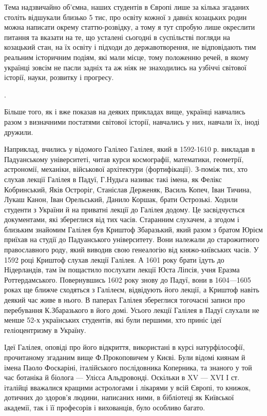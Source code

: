 Тема надзвичайно об'ємна, наших студентів в Європі лише за кілька згаданих
століть відшукали близько 5 тис, про освіту кожної з давніх козацьких родин
можна написати окрему статтю-розвідку, а тому я тут спробую лише окреслити
питання та вказати на те, що усталені сьогодні в суспільстві погляди на
козацький стан, на їх освіту і підходи до державотворення, не відповідають тим
реальним історичним подіям, які мали місце, тому положенню речей, в якому
українці зовсім не пасли задніх та аж ніяк не знаходились на узбіччі світової
історії, науки, розвитку і прогресу.

.

Більше того, як і вже показав на деяких прикладах вище, українці навчались
разом з визначними постатями світової історії, навчались у них, навчали їх,
іноді дружили.

Наприклад, вчились у відомого Галілео Галілея, який в 1592-1610 р. викладав в
Падуанському університеті, читав курси космографії, математики, геометрії,
астрономії, механіки, військової архітектури (фортифікації). З-поміж тих, хто
слухав лекції Галілея в Падуї, Г.Нудьга називає такі імена, як Фелікс
Кобринський, Яків Остроріг, Станіслав Держеняк, Василь Копеч, Іван Тичина,
Лукаш Канон, Іван Орельський, Данило Коршак, брати Острозькі. Ходили студенти з
України й на приватні лекції до Галілея додому. Це засвідчується документами,
які збереглися від тих часів. Старанним слухачем, а згодом і близьким знайомим
Галілея був Криштоф Збаразький, який разом з братом Юрієм приїхав на студії до
Падуанського університету. Вони належали до старожитного православного роду,
який виводив свою генеалогію від княжо-київських часів. У 1592 році Криштоф
слухав лекції Галілея. А 1601 року брати їдуть до Нідерландів, там їм пощастило
послухати лекції Юста Ліпсія, учня Еразма Роттердамського. Повернувшись 1602
року знову до Падуї, вони в 1604—1605 роках ще ближче сходяться з Галілеєм,
відвідують його лекції, а Криштоф навіть деякий час живе в нього. В паперах
Галілея збереглися тогочасні записи про перебування К.Збаразького в його домі.
Усього лекції Галілея в Падуї слухали не менше 52-х українських студентів, які
були першими, хто приніс ідеї геліоцентризму в Україну.

Ідеї Галілея, оповіді про його відкриття, використані в курсі натурфілософії,
прочитаному згаданим вище Ф.Прокоповичем у Києві. Були відомі киянам й імена
Паоло Фоскаріні, італійського послідовника Коперника, та знаного у той час
ботаніка й біолога — Улісса Альдровонді. Оскільки в XV — XVI I ст. італійці
вважалися кращими астрологами і лікарями у всій Європі, то книжок, дотичних до
здоров'я людини, написаних ними, в бібліотеці як Київської академії, так і її
професорів і вихованців, було особливо багато.

